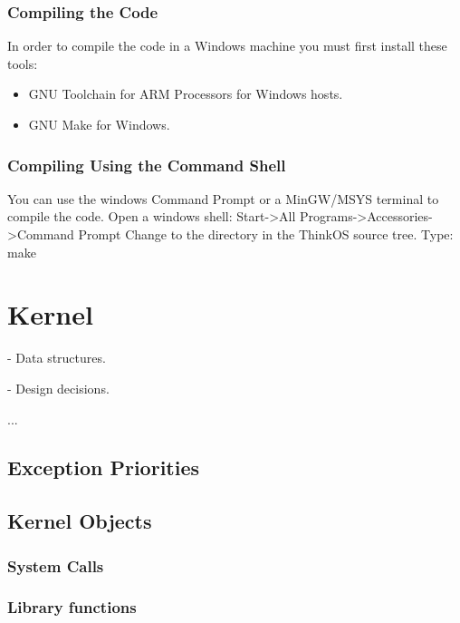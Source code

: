 \subsubsection{Compiling the Code}

In order to compile the code in a Windows machine you must first install these tools:
\begin{itemize}
\item GNU Toolchain for ARM Processors for Windows hosts.
\item GNU Make for Windows.
\end{itemize}

\subsubsection{Compiling Using the Command Shell}

You can use the windows Command Prompt or a MinGW/MSYS terminal to compile the code.
Open a windows shell: Start->All Programs->Accessories->Command Prompt
Change to the directory  in the ThinkOS source tree.
Type: make

\section{\ThinkOS Kernel}

 - Data structures.
 
 - Design decisions.
 
 ...

\subsection{Exception Priorities}



\subsection{Kernel Objects}

\subsubsection{System Calls}

\subsubsection{Library functions}




